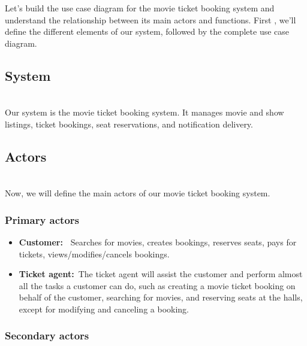 

Let's build the use case diagram for the movie ticket booking system and understand the relationship between its main actors and functions. First , we'll define the different elements of our system, followed by the complete use case diagram.

\subsection{System}\label{iZoEi88vn7jA-PUgdVkqt}
\\
Our system is the movie ticket booking system. It manages movie and show listings, ticket bookings, seat reservations, and notification delivery.

\subsection{Actors}\label{zRbErjZKFz6Kd1tal5lxu}
\\
Now, we will define the main actors of our movie ticket booking system.

\subsubsection{Primary actors}\label{Ko_2oRm_G-gdHolbZitlm}

\begin{itemize}
\item
\protect{}\label{8mSrXwj9yCvLyWZTtTvRP}
\textbf{Customer:~} Searches for movies, creates bookings, reserves seats, pays for tickets, views/modifies/cancels bookings.
\item
\protect{}\label{5FKRfJNiiuwEku6sVCoXC}
\textbf{Ticket agent:}~The ticket agent will assist the customer and perform almost all the tasks a customer can do, such as creating a movie ticket booking on behalf of the customer, searching for movies, and reserving seats at the halls, except for modifying and canceling a booking.
\end{itemize}

\subsubsection{Secondary actors}\label{h0YJQvVfODmpfJo-4IGwx}

